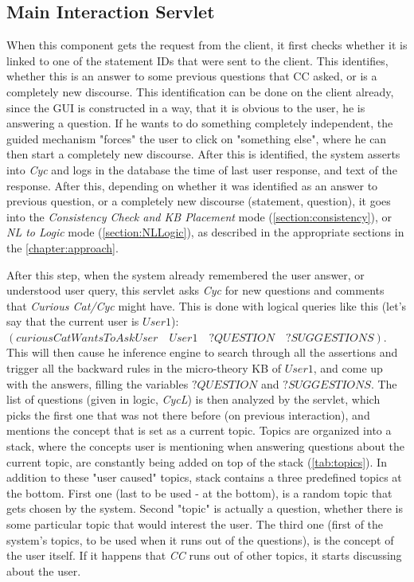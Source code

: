 \subsection{Main Interaction Servlet}
\label{section:mainServlet}
When this component gets the request from the client, it first checks whether
it is linked to one of the statement IDs that were sent to the client. This
identifies, whether this is an answer to some previous questions that CC
asked, or is a completely new discourse. This identification can be done on 
the client already, since the GUI is constructed in a way, that it is obvious
to the user, he is answering a question. If he wants to do something completely
independent, the guided mechanism "forces" the user to click on 
"something else", where he can then start a completely new discourse.
After this is identified, the system asserts into  \emph{Cyc} and logs
in the database  the time of last user response, and text of the
response. After this, depending on whether it was identified as an answer to
previous question, or a completely new discourse (statement, question), it goes
into the \emph{Consistency Check and KB Placement} mode 
(\autoref{section:consistency}), or \emph{NL to Logic} mode 
(\autoref{section:NLLogic}), as described in the appropriate sections in the 
\autoref{chapter:approach}. 

After this step, when the system already remembered
the user answer, or understood user query, this servlet asks \emph{Cyc} for
new questions and comments that \emph{Curious Cat/Cyc} might have. This is done
with logical queries like this (let's say that the current user is $User1$):
$(curiousCatWantsToAskUser\quad User1 \quad ?QUESTION \quad ?SUGGESTIONS)$. This
will then cause he inference engine to search through all the assertions and
trigger all the backward rules in the micro-theory KB of $User1$, and come up
with the answers, filling the variables $?QUESTION$ and $?SUGGESTIONS$. The list
of questions (given in logic, \emph{CycL}) is then analyzed by the servlet,
which picks the first one that was not there before (on previous interaction),
and mentions the concept that is set as a current topic. Topics are organized
into a stack, where the concepts user is mentioning when answering questions
about the current topic, are constantly being added on top of the stack 
(\autoref{tab:topics}). 
In addition to these "user caused" topics, stack contains a three predefined
topics at the bottom. First one (last to be used - at the bottom), is a
random topic that gets chosen by the system. Second "topic" is actually a
question, whether there is some particular topic that would interest the user.
The third one (first of the system's topics, to be used when it runs out of
the questions), is the concept of the user itself. If it happens that \emph{CC}
runs out of other topics, it starts discussing about the user. 

